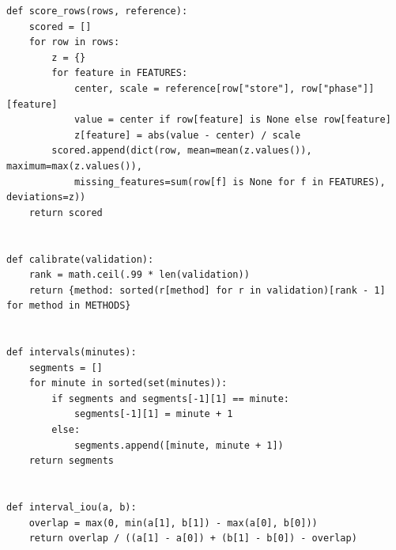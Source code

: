\begin{Verbatim}[breaklines,breakanywhere,fontsize=\small]
def score_rows(rows, reference):
    scored = []
    for row in rows:
        z = {}
        for feature in FEATURES:
            center, scale = reference[row["store"], row["phase"]][feature]
            value = center if row[feature] is None else row[feature]
            z[feature] = abs(value - center) / scale
        scored.append(dict(row, mean=mean(z.values()), maximum=max(z.values()),
            missing_features=sum(row[f] is None for f in FEATURES), deviations=z))
    return scored


def calibrate(validation):
    rank = math.ceil(.99 * len(validation))
    return {method: sorted(r[method] for r in validation)[rank - 1] for method in METHODS}


def intervals(minutes):
    segments = []
    for minute in sorted(set(minutes)):
        if segments and segments[-1][1] == minute:
            segments[-1][1] = minute + 1
        else:
            segments.append([minute, minute + 1])
    return segments


def interval_iou(a, b):
    overlap = max(0, min(a[1], b[1]) - max(a[0], b[0]))
    return overlap / ((a[1] - a[0]) + (b[1] - b[0]) - overlap)



\end{Verbatim}
